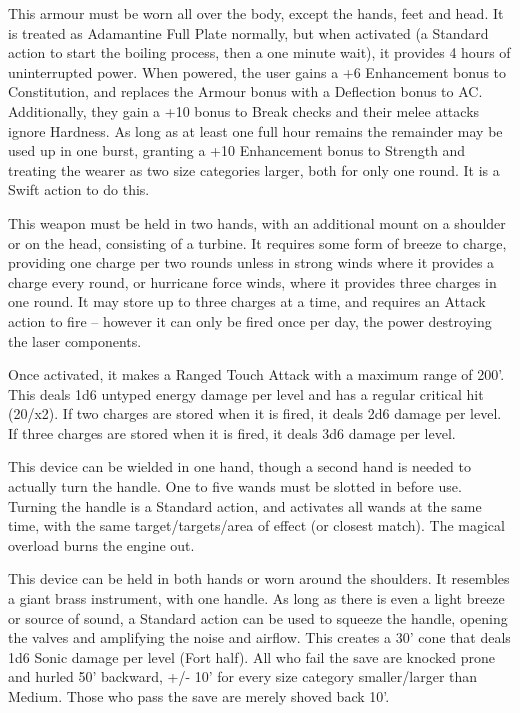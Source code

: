 {This armour must be worn all over the body, except the hands, feet and head. It is treated as Adamantine Full Plate normally, but when activated (a Standard action to start the boiling process, then a one minute wait), it provides 4 hours of uninterrupted power. When powered, the user gains a +6 Enhancement bonus to Constitution, and replaces the Armour bonus with a Deflection bonus to AC. Additionally, they gain a +10 bonus to Break checks and their melee attacks ignore Hardness. As long as at least one full hour remains the remainder may be used up in one burst, granting a +10 Enhancement bonus to Strength and treating the wearer as two size categories larger, both for only one round. It is a Swift action to do this.}

{This weapon must be held in two hands, with an additional mount on a shoulder or on the head, consisting of a turbine. It requires some form of breeze to charge, providing one charge per two rounds unless in strong winds where it provides a charge every round, or hurricane force winds, where it provides three charges in one round. It may store up to three charges at a time, and requires an Attack action to fire -- however it can only be fired once per day, the power destroying the laser components.\medskip

\noindent Once activated, it makes a Ranged Touch Attack with a maximum range of 200'. This deals 1d6 untyped energy damage per level and has a regular critical hit (20/x2). If two charges are stored when it is fired, it deals 2d6 damage per level. If three charges are stored when it is fired, it deals 3d6 damage per level.}

{This device can be wielded in one hand, though a second hand is needed to actually turn the handle. One to five wands must be slotted in before use. Turning the handle is a Standard action, and activates all wands at the same time, with the same target/targets/area of effect (or closest match). The magical overload burns the engine out.}

{This device can be held in both hands or worn around the shoulders. It resembles a giant brass instrument, with one handle. As long as there is even a light breeze or source of sound, a Standard action can be used to squeeze the handle, opening the valves and amplifying the noise and airflow. This creates a 30' cone that deals 1d6 Sonic damage per level (Fort half). All who fail the save are knocked prone and hurled 50' backward, +/- 10' for every size category smaller/larger than Medium. Those who pass the save are merely shoved back 10'.}

